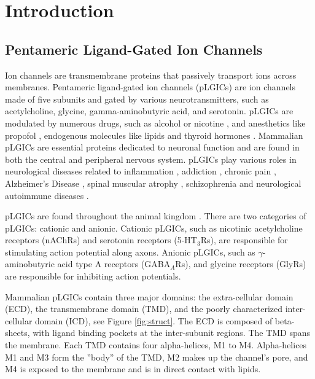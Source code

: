\documentclass[12pt]{ruthesis_nofloat}
\newcommand{\nachr}{nAChR}
\newcommand{\plgic}{pLGIC}
\newcommand{\gabaa}{GABA$_A$R}
\begin{document}
\chapter{Introduction}

\section{Pentameric Ligand-Gated Ion Channels}

Ion channels are transmembrane proteins that passively transport ions across membranes. Pentameric ligand-gated ion channels (\plgic s) are ion channels made of five subunits and gated by various neurotransmitters, such as acetylcholine, glycine, gamma-aminobutyric acid, and serotonin. \plgic s are modulated by numerous drugs, such as alcohol \cite{Sauguet2013} or nicotine \citep{Celie2004}, and anesthetics like propofol \citep{Chen2019a,Abadji1993}, endogenous molecules like lipids \citep{Dacosta2013,Nemecz2016} and thyroid hormones \citep{Westergard2015,Moffett2019}. Mammalian \plgic s are essential proteins dedicated to neuronal function and are found in both the central and peripheral nervous system. \plgic s play various roles in neurological diseases related to inflammation \citep{Taly2009,Cornelison2016,Patel2017,Yocum2017,Egea2015},  addiction \citep{Cornelison2016}, chronic pain \citep{Xiong2012}, Alzheimer's Disease \citep{Walstab2010,Picciotto_Neuroprotection_2008,MartinRuiz_4_1999,Kalamida2007}, spinal muscular atrophy \citep{Arnold_Reduced_2004}, schizophrenia \citep{Haydar2010,Kalamida2007} and neurological autoimmune diseases \citep{Lennon_Immunization_2003, Kumari2008}.

\plgic s are found throughout the animal kingdom \citep{Jaiteh2016}. There are two categories of \plgic s: cationic and anionic. Cationic \plgic s, such as nicotinic acetylcholine receptors (\nachr s) and serotonin receptors (5-HT$_3$Rs), are responsible for stimulating action potential along axons. Anionic \plgic s, such as $\gamma$-aminobutyric acid type A receptors (\gabaa s), and glycine receptors (GlyRs) are responsible for inhibiting action potentials. 

Mammalian \plgic s contain three major domains: the extra-cellular domain (ECD), the transmembrane domain (TMD), and the poorly characterized inter-cellular domain (ICD), see Figure \ref{fig:struct}. The ECD is composed of beta-sheets, with ligand binding pockets at the inter-subunit regions. The TMD spans the membrane. Each TMD contains four alpha-helices, M1 to M4. Alpha-helices M1 and M3 form the ''body'' of the TMD, M2 makes up the channel's pore, and M4 is exposed to the membrane and is in direct contact with lipids. 
\end{document}
